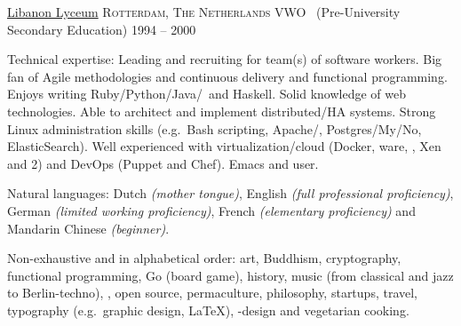 \documentclass[10pt,a4paper]{article}
\begin{document}
\headedsection
  {\href{http://www.libanonlyceum.nl}{Libanon Lyceum}}
  {\textsc{Rotterdam, The Netherlands}} {%
  \headedsubsection
    {VWO \textnormal{~(Pre-University Secondary Education)}}
    {1994 -- 2000} {}
}


\spacedhrule{0.5em}{-0.4em}


\inlineheadsection  %
  {Technical expertise:}
  {Leading and recruiting for team(s) of software workers.  Big fan of Agile methodologies and continuous delivery and functional programming.  Enjoys writing Ruby/\nsp Python/\nsp Java/\nsp \CPP~and Haskell.  Solid knowledge of web technologies.  Able to architect and implement distributed/HA systems.  Strong Linux administration skills (e.g.\ Bash scripting, Apache/, Postgres/My/No, ElasticSearch).  Well experienced with virtualization/cloud (Docker, ware, , Xen and 2) and DevOps (Puppet and Chef).  Emacs and  user.}

\vspace{0.5em}
\inlineheadsection
  {Natural languages:}
  {Dutch \emph{(mother tongue)}, English \emph{(full professional proficiency)}, German \emph{(limited working proficiency)}, French \emph{(elementary proficiency)} and Mandarin Chinese \emph{(beginner)}.}


\spacedhrule{1.6em}{-0.4em}


\inlineheadsection
  {Non-exhaustive and in alphabetical order:}
  {art, Buddhism, cryptography, functional programming, Go (board game), history, music (from classical and jazz to Berlin-techno), , open source, permaculture, philosophy, startups, travel, typography (e.g.\ graphic design, \LaTeX), -design and vegetarian cooking.}
\end{document}
